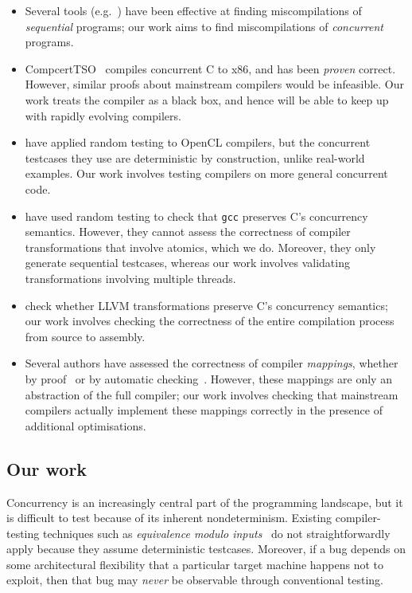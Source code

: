 \documentclass[acmsmall,review]{acmart}
\begin{document}
\begin{itemize}

\item
Several tools (e.g.~\cite{lopes+15}) have been effective at finding miscompilations of \emph{sequential} programs; our work aims to find miscompilations of \emph{concurrent} programs.

\item
CompcertTSO~\cite{sevcik+11} compiles concurrent C to x86, and has been \emph{proven} correct.
However, similar proofs about mainstream compilers would be infeasible.
Our work treats the compiler as a black box, and hence will be able to keep up with rapidly evolving compilers.

\item
\citet{lidbury+15} have applied random testing to OpenCL compilers, but the concurrent testcases they use are deterministic by construction, unlike real-world examples.
Our work involves testing compilers on more general concurrent code.

\item
\citet{morisset+13} have used random testing to check that \texttt{gcc} preserves C's concurrency semantics.
However, they cannot assess the correctness of compiler transformations that involve atomics, which we do.
Moreover, they only generate sequential testcases, whereas our work involves validating transformations involving multiple threads.

\item
\citet{chakraborty+16} check whether LLVM transformations preserve C's concurrency semantics; our work involves checking the correctness of the entire compilation process from source to assembly.

\item Several authors have assessed the correctness of compiler \emph{mappings}, whether by proof~\cite{batty+11, batty+12} or by automatic checking~\cite{wickerson+17, trippel+17}.
However, these mappings are only an abstraction of the full compiler; our work involves checking that mainstream compilers actually implement these mappings correctly in the presence of additional optimisations.

\end{itemize}

\subsection{Our work}

Concurrency is an increasingly central part of the programming landscape, but it is difficult to test because of its inherent nondeterminism.
Existing compiler-testing techniques such as \emph{equivalence modulo inputs}~\cite{le+14} do not straightforwardly apply because they assume deterministic testcases.
Moreover, if a bug depends on some architectural flexibility that a particular target machine happens not to exploit, then that bug may \emph{never} be observable through conventional testing.
\end{document}
